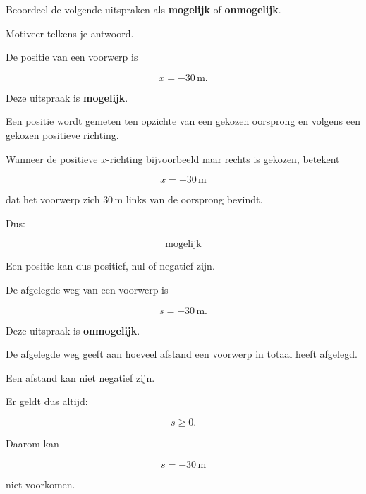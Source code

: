 \documentclass{ximera}
\begin{document}
\begin{oefening}{\oefB\ESS}

  Beoordeel de volgende uitspraken als \textbf{mogelijk} of \textbf{onmogelijk}.
  
  Motiveer telkens je antwoord.
  
  \begin{question}
  
  De positie van een voorwerp is
  
  \[
  x=-30\,\mathrm{m}.
  \]
  
  \begin{oplossing}
  
  Deze uitspraak is \textbf{mogelijk}.
  
  Een positie wordt gemeten ten opzichte van een gekozen oorsprong en volgens
  een gekozen positieve richting.
  
  Wanneer de positieve $x$-richting bijvoorbeeld naar rechts is gekozen,
  betekent
  
  \[
  x=-30\,\mathrm{m}
  \]
  
  dat het voorwerp zich $30\,\mathrm{m}$ links van de oorsprong bevindt.
  
  Dus:
  
  \[
  \boxed{\text{mogelijk}}
  \]
  
  Een positie kan dus positief, nul of negatief zijn.
  
  \end{oplossing}
  
  \end{question}
  
  
  \begin{question}
  
  De afgelegde weg van een voorwerp is
  
  \[
  s=-30\,\mathrm{m}.
  \]
  
  \begin{oplossing}
  
  Deze uitspraak is \textbf{onmogelijk}.
  
  De afgelegde weg geeft aan hoeveel afstand een voorwerp in totaal heeft
  afgelegd.
  
  Een afstand kan niet negatief zijn.
  
  Er geldt dus altijd:
  
  \[
  s \geq 0.
  \]
  
  Daarom kan
  
  \[
  s=-30\,\mathrm{m}
  \]
  
  niet voorkomen.
  

\end{oplossing}
\end{question}
\end{oefening}
\end{document}
